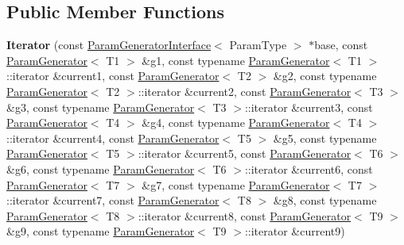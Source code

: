 \subsection*{Public Member Functions}
\begin{DoxyCompactItemize}
\item 
\mbox{\label{classtesting_1_1internal_1_1_cartesian_product_generator9_1_1_iterator_ad809d1827b2ce9d0649b101c545fbdc1}} 
{\bfseries Iterator} (const \mbox{\hyperlink{classtesting_1_1internal_1_1_param_generator_interface}{Param\+Generator\+Interface}}$<$ Param\+Type $>$ $\ast$base, const \mbox{\hyperlink{classtesting_1_1internal_1_1_param_generator}{Param\+Generator}}$<$ T1 $>$ \&g1, const typename \mbox{\hyperlink{classtesting_1_1internal_1_1_param_generator}{Param\+Generator}}$<$ T1 $>$\+::iterator \&current1, const \mbox{\hyperlink{classtesting_1_1internal_1_1_param_generator}{Param\+Generator}}$<$ T2 $>$ \&g2, const typename \mbox{\hyperlink{classtesting_1_1internal_1_1_param_generator}{Param\+Generator}}$<$ T2 $>$\+::iterator \&current2, const \mbox{\hyperlink{classtesting_1_1internal_1_1_param_generator}{Param\+Generator}}$<$ T3 $>$ \&g3, const typename \mbox{\hyperlink{classtesting_1_1internal_1_1_param_generator}{Param\+Generator}}$<$ T3 $>$\+::iterator \&current3, const \mbox{\hyperlink{classtesting_1_1internal_1_1_param_generator}{Param\+Generator}}$<$ T4 $>$ \&g4, const typename \mbox{\hyperlink{classtesting_1_1internal_1_1_param_generator}{Param\+Generator}}$<$ T4 $>$\+::iterator \&current4, const \mbox{\hyperlink{classtesting_1_1internal_1_1_param_generator}{Param\+Generator}}$<$ T5 $>$ \&g5, const typename \mbox{\hyperlink{classtesting_1_1internal_1_1_param_generator}{Param\+Generator}}$<$ T5 $>$\+::iterator \&current5, const \mbox{\hyperlink{classtesting_1_1internal_1_1_param_generator}{Param\+Generator}}$<$ T6 $>$ \&g6, const typename \mbox{\hyperlink{classtesting_1_1internal_1_1_param_generator}{Param\+Generator}}$<$ T6 $>$\+::iterator \&current6, const \mbox{\hyperlink{classtesting_1_1internal_1_1_param_generator}{Param\+Generator}}$<$ T7 $>$ \&g7, const typename \mbox{\hyperlink{classtesting_1_1internal_1_1_param_generator}{Param\+Generator}}$<$ T7 $>$\+::iterator \&current7, const \mbox{\hyperlink{classtesting_1_1internal_1_1_param_generator}{Param\+Generator}}$<$ T8 $>$ \&g8, const typename \mbox{\hyperlink{classtesting_1_1internal_1_1_param_generator}{Param\+Generator}}$<$ T8 $>$\+::iterator \&current8, const \mbox{\hyperlink{classtesting_1_1internal_1_1_param_generator}{Param\+Generator}}$<$ T9 $>$ \&g9, const typename \mbox{\hyperlink{classtesting_1_1internal_1_1_param_generator}{Param\+Generator}}$<$ T9 $>$\+::iterator \&current9)

\end{DoxyCompactItemize}
